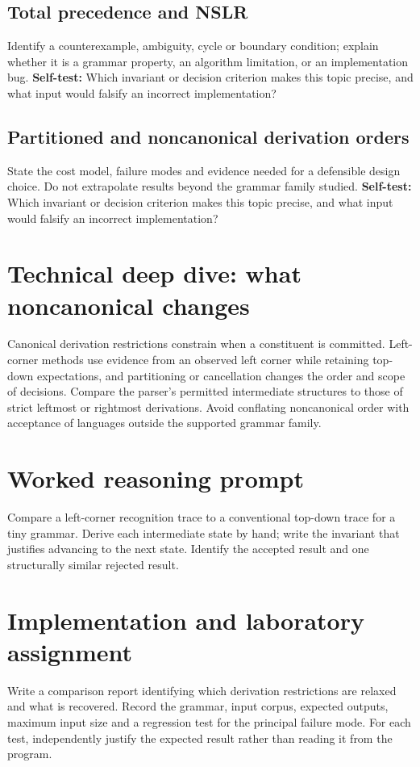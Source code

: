 \documentclass[11pt,letterpaper]{article}
\begin{document}
\subsection{Total precedence and NSLR}
Identify a counterexample, ambiguity, cycle or boundary condition; explain whether it is a grammar property, an algorithm limitation, or an implementation bug.
\textbf{Self-test:} Which invariant or decision criterion makes this topic precise, and what input would falsify an incorrect implementation?
\subsection{Partitioned and noncanonical derivation orders}
State the cost model, failure modes and evidence needed for a defensible design choice. Do not extrapolate results beyond the grammar family studied.
\textbf{Self-test:} Which invariant or decision criterion makes this topic precise, and what input would falsify an incorrect implementation?
\section{Technical deep dive: what noncanonical changes}
Canonical derivation restrictions constrain when a constituent is committed. Left-corner methods use evidence from an observed left corner while retaining top-down expectations, and partitioning or cancellation changes the order and scope of decisions. Compare the parser's permitted intermediate structures to those of strict leftmost or rightmost derivations. Avoid conflating noncanonical order with acceptance of languages outside the supported grammar family.
\section{Worked reasoning prompt}
Compare a left-corner recognition trace to a conventional top-down trace for a tiny grammar. Derive each intermediate state by hand; write the invariant that justifies advancing to the next state. Identify the accepted result and one structurally similar rejected result.
\section{Implementation and laboratory assignment}
Write a comparison report identifying which derivation restrictions are relaxed and what is recovered. Record the grammar, input corpus, expected outputs, maximum input size and a regression test for the principal failure mode. For each test, independently justify the expected result rather than reading it from the program.
\end{document}
